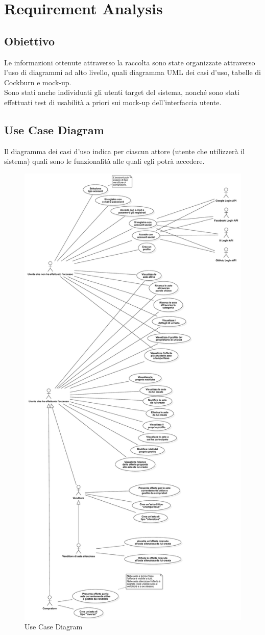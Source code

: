 
\chapter{Requirement Analysis}
    \section{Obiettivo}
        Le informazioni ottenute attraverso la raccolta sono state organizzate attraverso l'uso di diagrammi ad alto livello, quali diagramma UML dei casi d'uso, tabelle di Cockburn e mock-up. \\
        Sono stati anche individuati gli utenti target del sistema, nonché sono stati effettuati test di usabilità a priori sui mock-up dell'interfaccia utente.

    \section{Use Case Diagram}
        Il diagramma dei casi d'uso indica per ciascun attore (utente che utilizzerà il sistema) quali sono le funzionalità alle quali egli potrà accedere.
        \begin{figure}[htbp!]
            \centering
                \includegraphics[width=0.378\linewidth]{Immagini/Diagrammi/UseCaseDiagram.pdf}
            \caption{Use Case Diagram}
            \label{fig:Use Case Diagram}
        \end{figure}
    
